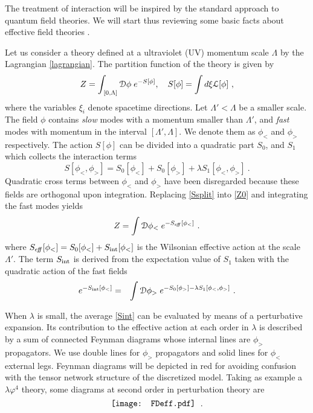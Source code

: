 \documentclass[a4paper,preprintnumbers,nofootinbib,twocolumn]{quantumarticle}
\newcommand{\be}{\begin{equation}} \newcommand{\ee}{\end{equation}}
\def\barray{\begin{eqnarray}}
\def\earray{\end{eqnarray}}
\begin{document}


The treatment of interaction will be inspired by the standard approach to quantum field theories. We will start thus reviewing some basic facts about effective field theories \cite{W75,S94}.

Let us consider a theory defined at a ultraviolet (UV) momentum scale $\Lambda$ by the Lagrangian \eqref{lagrangian}.
The partition function of the theory is given by
\be
Z=\int_{\,[0,\Lambda]} {\cal D} \phi  \; 
e^{- S[\phi] }, \quad S[\phi] =  \int d\xi {\cal L}[\phi] \ , 
\label{Z0}
\ee
where the  variables $\xi_i$ denote spacetime directions. 
Let $\Lambda' < \Lambda$ be a smaller scale. The field  $\phi$ contains {\em slow}  modes  with a momentum smaller than $\Lambda'$, 
and {\em fast}  modes with momentum in  the interval $[\Lambda', \Lambda]$. We denote them as $\phi_<$ and $\phi_>$ respectively. 
The action $S[\phi]$ can be divided into a quadratic part $S_0$, and $S_1$ which collects the interaction terms 
\be
S[\phi_<,\phi_>]= S_0[\phi_<]+ S_0[\phi_>]+\lambda S_1[\phi_<,\phi_>] \ . 
\label{Ssplit}
\ee
Quadratic cross terms between $\phi_<$ and $\phi_>$ have been disregarded because these fields are orthogonal upon integration. 
Replacing \eqref{Ssplit} into \eqref{Z0} and integrating the fast modes   yields 
\be
Z= \int {\cal D} \phi_<  \;   e^{ -S_{e\!f\!\!f}[\phi_<] }  \ .
\ee
where $S_{e\!f\!\!f}[\phi_<] = S_0[\phi_<] + S_{\rm int}[\phi_<]$ is the Wilsonian effective action at the  scale $\Lambda'$. 
The term $S_{\rm int}$ is derived from
the expectation value of $S_1$ taken with the quadratic action of the fast fields %
\barray
e^{ - S_{\rm int} [\phi_<]} & = &   \int {\cal D} \phi_>  \;  e^{-S_0[\phi_>] - \lambda   S_1[\phi_<,\phi_>] } \ .
\label{Sint}
 \earray
 
When $\lambda$ is small, the average  \eqref{Sint}  can be evaluated by means of a perturbative expansion. Its contribution to the effective action at each order in $\lambda$  is described by a sum of connected Feynman diagrams
whose internal lines are $\phi_>$ propagators. We use double lines for $\phi_>$ propagators and solid lines for $\phi_<$ external legs. Feynman diagrams will be depicted in red for avoiding confusion with the tensor network structure of the discretized model. Taking as example a $\lambda \varphi^4$ theory, some diagrams
at second order in perturbation theory are
\begin{equation}
 \vcenter{\hbox{\texttt{[image: FDeff.pdf]}}} 
 \hspace{1mm} 
 \ .
\label{effective}
\end{equation}
\end{document}
